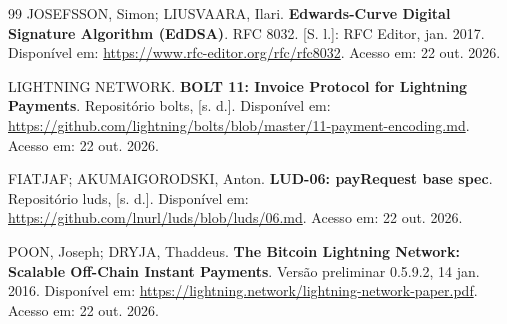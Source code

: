 \documentclass[openright]{normas-utf-tex}
\begin{document}
\begin{thebibliography}{99}
JOSEFSSON, Simon; LIUSVAARA, Ilari. \textbf{Edwards-Curve Digital Signature Algorithm (EdDSA)}. RFC 8032. [S. l.]: RFC Editor, jan. 2017. Disponível em: \url{https://www.rfc-editor.org/rfc/rfc8032}. Acesso em: 22 out. 2026.

LIGHTNING NETWORK. \textbf{BOLT 11: Invoice Protocol for Lightning Payments}. Repositório bolts, [s. d.]. Disponível em: \url{https://github.com/lightning/bolts/blob/master/11-payment-encoding.md}. Acesso em: 22 out. 2026.

FIATJAF; AKUMAIGORODSKI, Anton. \textbf{LUD-06: payRequest base spec}. Repositório luds, [s. d.]. Disponível em: \url{https://github.com/lnurl/luds/blob/luds/06.md}. Acesso em: 22 out. 2026.

POON, Joseph; DRYJA, Thaddeus. \textbf{The Bitcoin Lightning Network: Scalable Off-Chain Instant Payments}. Versão preliminar 0.5.9.2, 14 jan. 2016. Disponível em: \url{https://lightning.network/lightning-network-paper.pdf}. Acesso em: 22 out. 2026.
\end{thebibliography}
\end{document}
